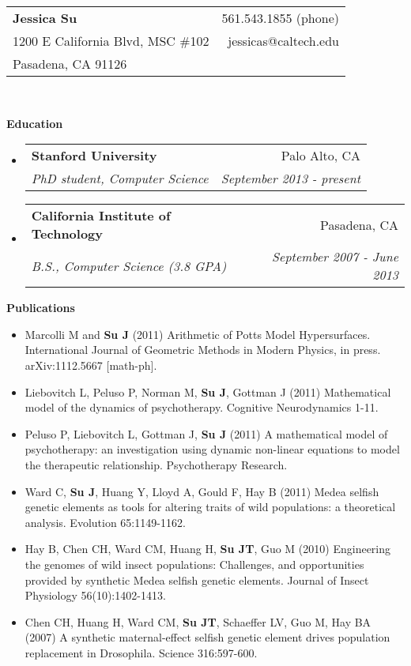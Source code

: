 \documentclass[letterpaper,11pt]{article}
\makeatletter
\newcommand{\resheading}[1]{{\large \colorbox{mygrey}{\begin{minipage}{\textwidth}{\textbf{#1 \vphantom{p\^{E}}}}\end{minipage}}}}
\newcommand{\ressubheading}[4]{
\begin{tabular*}{7.0in}{l@{\extracolsep{\fill}}r}
		\textbf{#1} & #2 \\
		\textit{#3} & \textit{#4} \\
\end{tabular*}\vspace{-6pt}}
\makeatother
\begin{document}
\begin{tabular*}{7.5in}{l@{\extracolsep{\fill}}r}
\textbf{\large Jessica Su}  & 561.543.1855 (phone)\\
1200 E California Blvd, MSC \#102 & jessicas@caltech.edu \\
Pasadena, CA 91126 & \\
\end{tabular*}
\\

\vspace{0.1in}

\resheading{Education}
\begin{itemize}
\item
	\ressubheading{Stanford University}{Palo Alto, CA}{PhD student, Computer Science}{September 2013 - present}
\item
	\ressubheading{California Institute of Technology}{Pasadena, CA}{B.S., Computer Science (3.8 GPA)}{September 2007 - June 2013}

\end{itemize}

\resheading{Publications}
\begin{itemize}
	\item Marcolli M and \textbf{Su J} (2011) Arithmetic of Potts Model Hypersurfaces.  International Journal of Geometric Methods in Modern Physics, in press.  arXiv:1112.5667 [math-ph].
	\item Liebovitch L, Peluso P, Norman M, \textbf{Su J}, Gottman J (2011) Mathematical model of the dynamics of psychotherapy.  Cognitive Neurodynamics 1-11.
	\item Peluso P, Liebovitch L, Gottman J, \textbf{Su J} (2011) A mathematical model of psychotherapy: an investigation using dynamic non-linear equations to model the therapeutic relationship.  Psychotherapy Research.
	\item Ward C, \textbf{Su J}, Huang Y, Lloyd A, Gould F, Hay B (2011) Medea selfish genetic elements as tools for altering traits of wild populations: a theoretical analysis.  Evolution 65:1149-1162.
	\item Hay B, Chen CH, Ward CM, Huang H, \textbf{Su JT}, Guo M (2010) Engineering the genomes of wild insect populations: Challenges, and opportunities provided by synthetic Medea selfish genetic elements.  Journal of Insect Physiology 56(10):1402-1413.
	\item Chen CH, Huang H, Ward CM, \textbf{Su JT}, Schaeffer LV, Guo M, Hay BA (2007) A synthetic maternal-effect selfish genetic element drives population replacement in Drosophila. Science 316:597-600.
\end{itemize}
\end{document}
